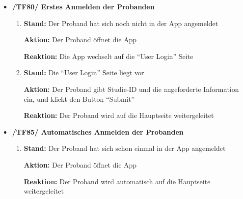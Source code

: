 \documentclass[a4paper]{scrreprt}
\begin{document}
            \begin{itemize}

            \item \textbf{/TF80/ Erstes Anmelden der \gls{Proband}en}
            \begin{enumerate}
                \item \par \textbf{Stand: }Der \gls{Proband} hat sich noch nicht in der App angemeldet
                \par \textbf{Aktion: }Der \gls{Proband} öffnet die App
                \par \textbf{Reaktion: }Die App wechselt auf die ``User Login'' Seite
                \item \par \textbf{Stand: }Die ``User Login'' Seite liegt vor
                \par \textbf{Aktion: }Der \gls{Proband} gibt Studie-ID und die angeforderte Information ein, und klickt den Button ``Submit''
                \par \textbf{Reaktion: }Der \gls{Proband} wird auf die Hauptseite weitergeleitet
            \end{enumerate}

	        \item \textbf{/TF85/ Automatisches Anmelden der \gls{Proband}en}
	        \begin{enumerate}
	        	\item \par \textbf{Stand: }Der \gls{Proband} hat sich schon einmal in der App angemeldet
	        	\par \textbf{Aktion: }Der \gls{Proband} öffnet die App
	        	\par \textbf{Reaktion: }Der \gls{Proband} wird automatisch auf die Hauptseite weitergeleitet
	        \end{enumerate}


\end{itemize}
\end{document}

